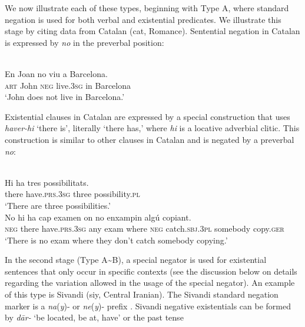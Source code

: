 ﻿\documentclass[output=paper]{langsci/langscibook}
\begin{document}
We now illustrate each of these types, beginning with Type A, where standard negation is used for both verbal and existential predicates. We illustrate this stage by citing data from Catalan (cat, Romance). Sentential negation in Catalan is expressed by \textit{no} in the preverbal position: 
%
\begin{exe}\ex\label{ex:ieur-catalan-Barcelona}
\\
    \gll En    Joan   no     viu          a   Barcelona. \\
\textsc{art}  John    \textsc{neg}   live.\textsc{3sg}   in Barcelona \\
    \glt `John does not live in Barcelona.' %
    \end{exe}
%
Existential clauses in Catalan are expressed by a special construction that uses \textit{haver-hi} `there is', literally `there has,' where \textit{hi} is a locative adverbial clitic. This construction is similar to other clauses in Catalan and is negated by a preverbal \textit{no}: 
%
\begin{exe}\ex\label{ex:ieur-catalan-possibilities}
\\
    \gll Hi      ha                  tres   possibilitats.  \\
there have.\textsc{prs}.\textsc{3sg} three possibility.\textsc{pl} \\
    \glt `There are three possibilities.' 
\ex\label{ex:ieur-catalan-copying}
\\
    \gll No hi ha cap examen on no enxampin algú copiant.  \\
\textsc{neg}   there have.\textsc{prs.3sg}   any exam 
where \textsc{neg}   catch.\textsc{sbj.3pl}   somebody  copy.\textsc{ger}\\
    \glt `There is no exam where they don't catch somebody copying.' 
    \end{exe}
%
In the second stage (Type A{\textasciitilde}B), a special negator is used
for existential sentences that only occur in specific contexts (see the
discussion below on details regarding the variation allowed in the usage of
the special negator). An example of this type is Sivandi (siy, Central
Iranian). The Sivandi standard negation marker is a \textit{na}(\textit{y})- or
\textit{ne}(\textit{y})- prefix \citep[69]{Lecoq1979}. Sivandi negative existentials
can be formed by \textit{dār-} `be located, be at, have' or the past tense
\end{document}
